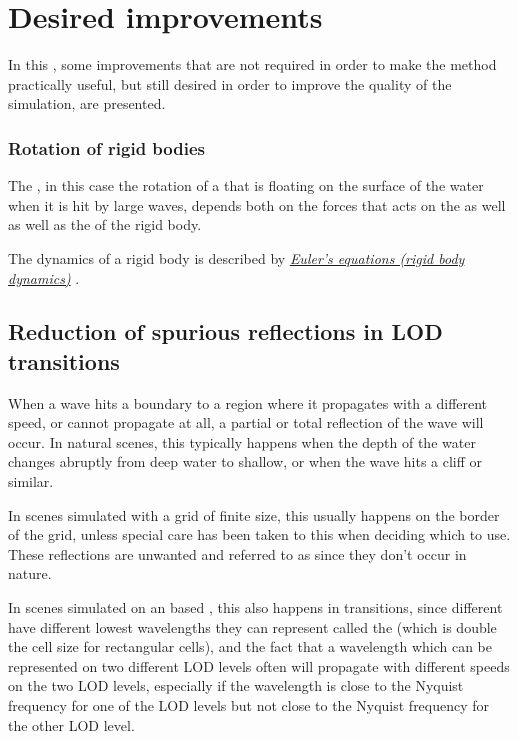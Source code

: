 \section{Desired improvements}

In this \levelname, some improvements that are not required in order to make the method practically useful, but still desired in order to improve the quality of the simulation, are presented.

\subsubsection{Rotation of rigid bodies}

The , in this case the rotation of a \ship that is floating on the surface of the water when it is hit by large waves, depends both on the forces that acts on the  as well as well as the   of the rigid body.

The dynamics of a rigid body is described by \textit{\href{http://en.wikipedia.org/wiki/Euler\%27s_equations_\%28rigid_body_dynamics\%29}{Euler's equations (rigid body dynamics)}} \citep{temp}.

\subsection{Reduction of spurious reflections in LOD transitions}

When a wave hits a boundary to a region where it propagates with a different speed, or cannot propagate at all, a partial or total reflection of the wave will occur. In natural scenes, this typically happens when the depth of the water changes abruptly from deep water to shallow, or when the wave hits a cliff or similar.

In scenes simulated with a grid of finite size, this usually happens on the border of the grid, unless special care has been taken to this when deciding which  to use. These reflections are unwanted and referred to as  since they don't occur in nature.

In scenes simulated on an \octree based \grid, this also happens in \LOD transitions, since different  have different lowest wavelengths they can represent called the  (which is double the cell size for rectangular cells), and the fact that a wavelength which can be represented on two different LOD levels often will propagate with different speeds on the two LOD levels, especially if the wavelength is close to the Nyquist frequency for one of the LOD levels but not close to the Nyquist frequency for the other LOD level.

